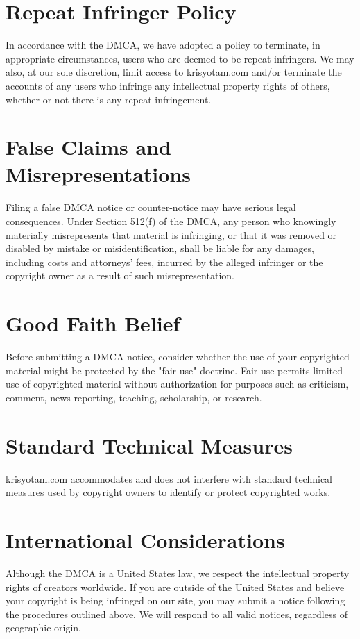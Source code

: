 \documentclass[11pt]{article}
\begin{document}
\section{Repeat Infringer Policy}
In accordance with the DMCA, we have adopted a policy to terminate, in appropriate circumstances, users who are deemed to be repeat infringers. We may also, at our sole discretion, limit access to krisyotam.com and/or terminate the accounts of any users who infringe any intellectual property rights of others, whether or not there is any repeat infringement.

\section{False Claims and Misrepresentations}
Filing a false DMCA notice or counter-notice may have serious legal consequences. Under Section 512(f) of the DMCA, any person who knowingly materially misrepresents that material is infringing, or that it was removed or disabled by mistake or misidentification, shall be liable for any damages, including costs and attorneys' fees, incurred by the alleged infringer or the copyright owner as a result of such misrepresentation.

\section{Good Faith Belief}
Before submitting a DMCA notice, consider whether the use of your copyrighted material might be protected by the "fair use" doctrine. Fair use permits limited use of copyrighted material without authorization for purposes such as criticism, comment, news reporting, teaching, scholarship, or research.

\section{Standard Technical Measures}
krisyotam.com accommodates and does not interfere with standard technical measures used by copyright owners to identify or protect copyrighted works.

\section{International Considerations}
Although the DMCA is a United States law, we respect the intellectual property rights of creators worldwide. If you are outside of the United States and believe your copyright is being infringed on our site, you may submit a notice following the procedures outlined above. We will respond to all valid notices, regardless of geographic origin.
\end{document}
